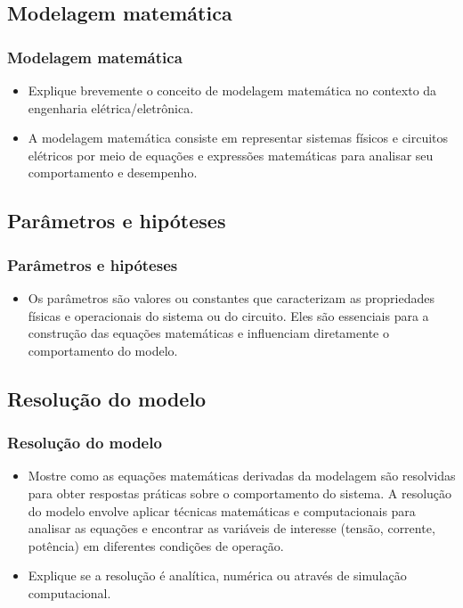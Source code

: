 \documentclass[hyperref={colorlinks=true,    
allcolors = blue,citecolor=blue}]{beamer} %
\begin{document}
\begin{frame}
\section{Modelagem matemática}
\frametitle{Modelagem matemática}

\begin{itemize}
    \item Explique brevemente o conceito de modelagem matemática no contexto da engenharia elétrica/eletrônica.
    \item A modelagem matemática consiste em representar sistemas físicos e circuitos elétricos por meio de equações e expressões matemáticas para analisar seu comportamento e desempenho.
\end{itemize}

\end{frame}
\begin{frame}
\subsection{Parâmetros e hipóteses}
\frametitle{Parâmetros e hipóteses}

\begin{itemize}
    \item Os parâmetros são valores ou constantes que caracterizam as propriedades físicas e operacionais do sistema ou do circuito. Eles são essenciais para a construção das equações matemáticas e influenciam diretamente o comportamento do modelo.
\end{itemize}

\end{frame}
\begin{frame}
\subsection{Resolução do modelo}
\frametitle{Resolução do modelo}

\begin{itemize}
    \item Mostre como as equações matemáticas derivadas da modelagem são resolvidas para obter respostas práticas sobre o comportamento do sistema. A resolução do modelo envolve aplicar técnicas matemáticas e computacionais para analisar as equações e encontrar as variáveis de interesse (tensão, corrente, potência) em diferentes condições de operação.
    \item Explique se a resolução é analítica, numérica ou através de simulação computacional.
\end{itemize}

\end{frame}
\end{document}
